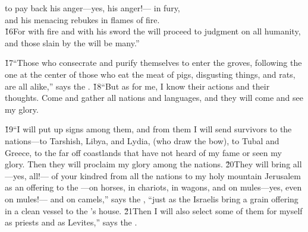 \begin{poetry}
\poeml to pay back his anger---yes, his anger!--- in fury, \\
\poemll    and his menacing rebukes in flames of fire. \\
\poeml \v{16}For with fire and with his sword the  will proceed to judgment on all humanity, \\
\poemll    and those slain by the  will be many.''
\end{poetry}

\v{17}``Those who consecrate and purify themselves to enter the groves, following the one at the center of those who eat the meat of pigs, disgusting things, and rats, are all alike,'' says the . \v{18}``But as for me, I know their actions and their thoughts. Come and gather all nations and languages, and they will come and see my glory.

\v{19}``I will put up signs among them, and from them I will send survivors to the nations---to Tarshish, Libya, and Lydia, (who draw the bow), to Tubal and Greece, to the far off coastlands that have not heard of my fame or seen my glory. Then they will proclaim my glory among the nations. \v{20}They will bring all---yes, all!--- of your kindred from all the nations to my holy mountain Jerusalem as an offering to the ---on horses, in chariots, in wagons, and on mules---yes, even on mules!--- and on camels,'' says the , ``just as the Israelis bring a grain offering in a clean vessel to the 's house. \v{21}Then I will also select some of them for myself as priests and as Levites,'' says the .

